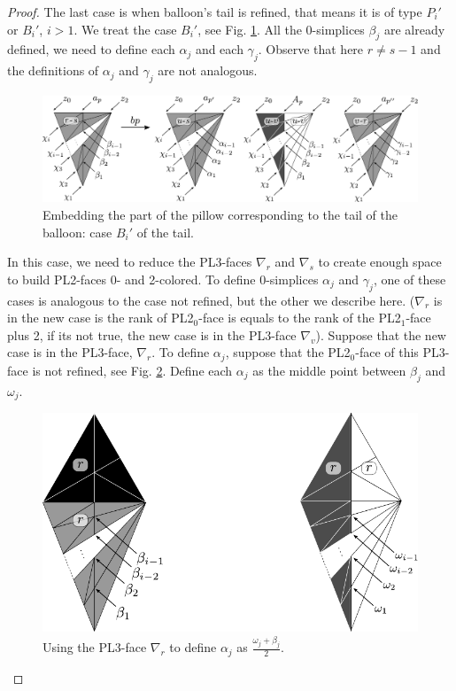 \begin{proof}
The last case is when balloon's tail is refined, that means it is of type $P_i'$ or $B_i'$, $i>1$. We treat the case $B_i'$,
 see Fig. \ref{fig:3d4}. All the 0-simplices $\beta_j$ are already defined, we need to define each
$\alpha_j$ and each $\gamma_j$. Observe that here $r\neq s-1$ and the definitions of $\alpha_j$ and $\gamma_j$ 
are not analogous.

\begin{figure}[!htb] 
\begin{center}
\includegraphics[width=15cm]{A.figs/3d4.pdf}
\caption{Embedding the part of the pillow corresponding to the tail of the balloon: case $B_i'$ of the tail.}
\label{fig:3d4}
\end{center}
\end{figure}


In this case, we need to reduce the PL3-faces $\nabla_r$ and $\nabla_s$
to create enough space to build PL2-faces 0- and 2-colored.
To define 0-simplices $\alpha_j$ and $\gamma_j$, one of these cases is analogous to the case not
 refined, but the other we describe here. ($\nabla_r$ is in the new case is the rank 
 of PL2$_0$-face is equals to the rank of the PL2$_1$-face plus 2, if its not true,
the new case is in the PL3-face $\nabla_v$).
Suppose that the new case is in the PL3-face, $\nabla_r$. To define $\alpha_j$,
suppose that the PL2$_0$-face of this PL3-face is not refined,
 see Fig. \ref{fig:3d5}. Define each $\alpha_j$  as the middle point between $\beta_j$ and $\omega_j$.



\begin{figure}[!htb] 
\begin{center}
\includegraphics[scale=0.7]{A.figs/3d5.pdf}
\caption{Using the PL3-face $\nabla_r$ to define $\alpha_j$ as $\frac{\omega_j+\beta_j}{2}$.}
\label{fig:3d5}
\end{center}
\end{figure}


\end{proof}
